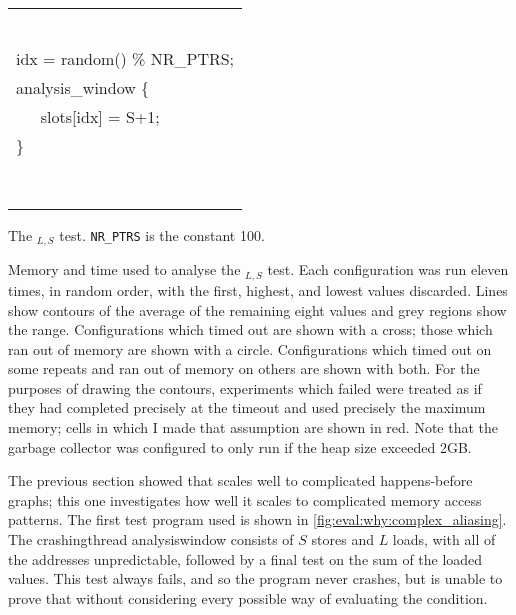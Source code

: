 \begin{sanefig}
{{{\begin{tabular}{ll}
        \\
        \\
        \\
        \\
        \\
        \\
        \\
        \multicolumn{2}{l}{idx = random() \% NR\_PTRS;}\\
        \multicolumn{2}{l}{analysis\_window \{} \\
        & slots[idx] = S+1; \\
        \multicolumn{2}{l}{\}}\\
        \\
        \\
        \\
        \\
        \\
        \\
        \\
        \\
      \end{tabular}
    }
  }
  }
  {\hfill}
  \caption{The $_{L,S}$ test.
    \texttt{NR\_PTRS} is the constant 100.}
  \label{fig:eval:why:complex_aliasing}
\end{sanefig}

\begin{sanefig}
  \caption{Memory and time used to analyse the
    $_{L,S}$ test.  Each configuration was run
    eleven times, in random order, with the first, highest, and lowest
    values discarded.  Lines show contours of the average of the
    remaining eight values and grey regions show the range.
    Configurations which timed out are shown with a cross; those which
    ran out of memory are shown with a circle.  Configurations which
    timed out on some repeats and ran out of memory on others are
    shown with both.  For the purposes of drawing the contours,
    experiments which failed were treated as if they had completed
    precisely at the timeout and used precisely the maximum memory;
    cells in which I made that assumption are shown in red.  Note that
    the {\implementation} garbage collector was configured to only run
    if the heap size exceeded 2GB.}
  \label{fig:eval:why:complex_aliasing:result1}
\end{sanefig}

\noindent
The previous section showed that {\implementation} scales well to
complicated happens-before graphs; this one investigates how well it
scales to complicated memory access patterns.  The first test program
used is shown in \autoref{fig:eval:why:complex_aliasing}.  The
\gls{crashingthread} \gls{analysiswindow} consists of $S$ stores and
$L$ loads, with all of the addresses unpredictable, followed by a
final test on the sum of the loaded values.  This test always fails,
and so the program never crashes, but {\implementation} is unable to
prove that without considering every possible way of evaluating the
condition.

